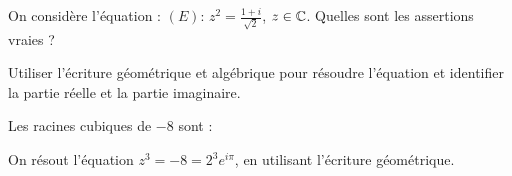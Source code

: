 \begin{question}
 
On considère l'équation : $(E) : \, z^2 = \frac{1+i}{\sqrt 2}$, $z\in \mathbb{C}$.   Quelles sont les assertions vraies ?
\begin{answers}
      
    

    
    
\end{answers}
\begin{explanations}
Utiliser l'écriture géométrique et algébrique pour résoudre l'équation et identifier la partie réelle et la partie imaginaire.
\end{explanations}

\end{question}


\begin{question}
 
Les racines cubiques de $-8$ sont : 
\begin{answers}
   
    

    
\end{answers}
\begin{explanations}
On résout l'équation $z^3=-8 = 2^3e^{i\pi}$, en utilisant l'écriture géométrique.
\end{explanations}

\end{question}



